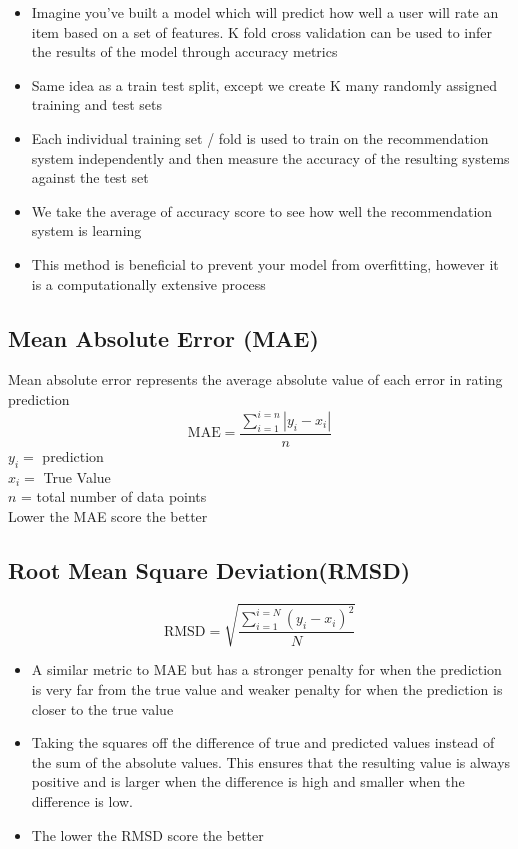 \begin{itemize}
\item Imagine you’ve built a model which will predict how well a user will rate an item based on a set of features. K fold cross validation can be used to infer the results of the model through accuracy metrics
\item Same idea as a train test split, except we create K many randomly assigned training and test sets
\item Each individual training set / fold is used to train on the recommendation system independently and then measure the accuracy of the resulting systems against the test set
\item We take the average of accuracy score to see how well the recommendation system is learning
\item This method is beneficial to prevent your model from overfitting, however it is a computationally extensive process
\end{itemize}

\subsection{Mean Absolute Error (MAE)}
Mean absolute error represents the average absolute value of each error in rating prediction
\begin{equation*}
\text{MAE} = \frac{\sum^{i=n}_{i=1}|y_{i} - x_{i}|}{n}
\end{equation*}
$y_{i}  = $ prediction
\\$x_{i}  = $ True Value
\\$n$ = total number of data points
\\Lower the MAE score the better

\subsection{Root Mean Square Deviation(RMSD)}
\begin{equation*}
\text{RMSD} = \sqrt{\frac{\sum^{i=N}_{i=1}(y_{i} - x_{i})^{2}}{N}}
\end{equation*}

\begin{itemize}
\item A similar metric to MAE but has a stronger penalty for when the prediction is very far from the true value and weaker penalty for when the prediction is closer to the true value
\item Taking the squares off the difference of true and predicted values instead of the sum of the absolute values. This ensures that the resulting value is always positive and is larger when the difference is high and smaller when the difference is low.
\item The lower the RMSD score the better
\end{itemize}


